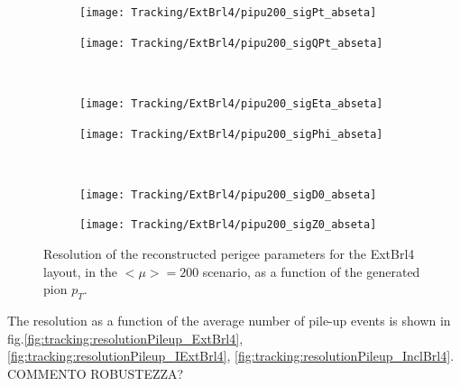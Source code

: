 \documentclass[a4paper,twoside,12pt]{article}
\begin{document}
\begin{figure}
\begin{subfigure}{.5\linewidth}
\texttt{[image: Tracking/ExtBrl4/pipu200\_sigPt\_abseta]}
\caption{}
\label{fig:tracking:pipu200_sigPt_abseta}
\end{subfigure}
\begin{subfigure}{.5\linewidth}
\texttt{[image: Tracking/ExtBrl4/pipu200\_sigQPt\_abseta]}
\caption{}
\label{fig:tracking:pipu200_sigQPt_abseta}
\end{subfigure}\\[1ex]
\begin{subfigure}{.5\linewidth}
\texttt{[image: Tracking/ExtBrl4/pipu200\_sigEta\_abseta]}
\caption{}
\label{fig:tracking:pipu200_sigEta_abseta}
\end{subfigure}
\begin{subfigure}{.5\linewidth}
\texttt{[image: Tracking/ExtBrl4/pipu200\_sigPhi\_abseta]}
\caption{}
\label{fig:tracking:pipu200_sigPhi_abseta}
\end{subfigure}\\[1ex]
\begin{subfigure}{.5\linewidth}
\texttt{[image: Tracking/ExtBrl4/pipu200\_sigD0\_abseta]}
\caption{}
\label{fig:tracking:pipu200_sigD0_abseta}
\end{subfigure}
\begin{subfigure}{.5\linewidth}
\texttt{[image: Tracking/ExtBrl4/pipu200\_sigZ0\_abseta]}
\caption{}
\label{fig:tracking:pipu200_sigZ0_abseta}
\end{subfigure}
\caption{Resolution of the reconstructed perigee parameters for the ExtBrl4 layout, in the $<\mu> = 200$ scenario, as a function of the generated pion $p_{T}$.}
\label{fig:tracking:pionResolutionPt}
\end{figure}

The resolution as a function of the average number of pile-up events is shown in fig.\ref{fig:tracking:resolutionPileup_ExtBrl4}, \ref{fig:tracking:resolutionPileup_IExtBrl4}, \ref{fig:tracking:resolutionPileup_InclBrl4}. COMMENTO ROBUSTEZZA?
\end{document}
